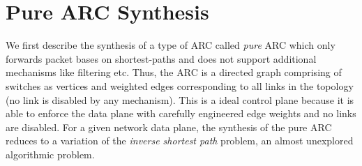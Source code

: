


\section{Pure ARC Synthesis}
We first describe the synthesis of a type of ARC 
called {\em pure} ARC which
only forwards packet bases on shortest-paths and does 
not support additional mechanisms like filtering etc. 
Thus, 
the ARC is a directed graph comprising of switches as 
vertices and weighted edges corresponding to all links in the
topology (no link is disabled by any mechanism). 
This is 
a ideal control plane because it is able to enforce the data plane
with carefully engineered edge weights and no links are disabled. 
For a given network data plane, the synthesis of 
the pure ARC reduces to a
variation of the {\em inverse shortest path} problem, an almost 
unexplored algorithmic problem. 

